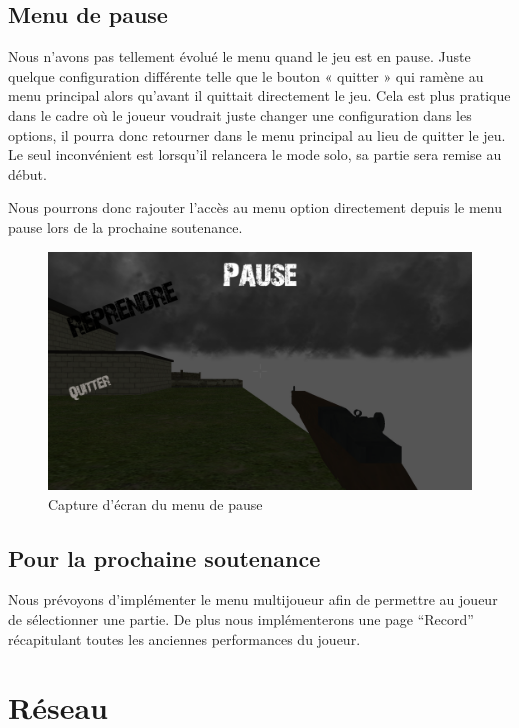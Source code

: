 \documentclass[11pt]{report}
\begin{document}
\subsection{Menu de pause}

Nous n’avons pas tellement évolué le menu quand le jeu est en pause. Juste quelque configuration différente telle que le bouton « quitter » qui ramène au menu principal alors qu’avant il quittait directement le jeu. Cela est plus pratique dans le cadre où le joueur voudrait juste changer une configuration dans les options, il pourra donc retourner dans le menu principal au lieu de quitter le jeu. Le seul inconvénient est lorsqu’il relancera le mode solo, sa partie sera remise au début.

Nous pourrons donc rajouter l’accès au menu option directement depuis le menu pause lors de la prochaine soutenance.

\begin{figure}[htbp]
\centering
\includegraphics[scale=0.13]{menu-pause.png}
\caption{Capture d'écran du menu de pause}
\end{figure}

\subsection{Pour la prochaine soutenance}

Nous prévoyons d’implémenter le menu multijoueur afin de permettre au joueur de sélectionner une partie. De plus nous implémenterons une page ``Record'' récapitulant toutes les anciennes performances du joueur.


\newpage
\section{Réseau}
\end{document}
